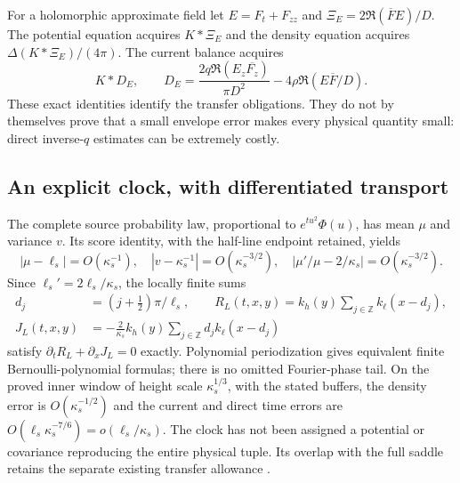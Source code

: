 For a holomorphic approximate field let $E=F_t+F_{zz}$ and
$\Xi_E=2\Re(\overline F E)/D$. The potential equation acquires
$K*\Xi_E$ and the density equation acquires
$\Delta(K*\Xi_E)/(4\pi)$. The current balance acquires
\begin{equation}
 K*D_E,\qquad
 D_E=\frac{2q\Re(E_z\overline{F_z})}{\pi D^2}
             -4\rho\Re(E\overline F/D).
 \label{eq:holomorphic-defect}
\end{equation}
These exact identities identify the transfer obligations. They do not
by themselves prove that a small envelope error makes every physical
quantity small: direct inverse-$q$ estimates can be extremely costly.

\subsection{An explicit clock, with differentiated transport}
The complete source probability law, proportional to $e^{tu^2}\Phi(u)$,
has mean $\mu$ and variance $v$. Its score identity, with the half-line
endpoint retained, yields
\begin{equation}
 |\mu-\ell_s|=O(\kappa_s^{-1}),\quad
 |v-\kappa_s^{-1}|=O(\kappa_s^{-3/2}),\quad
 |\mu'/\mu-2/\kappa_s|=O(\kappa_s^{-3/2}).
 \label{eq:score-refinement}
\end{equation}
Since $\ell_s'=2\ell_s/\kappa_s$, the locally finite sums
\begin{align}
 d_j&=(j+\tfrac12)\pi/\ell_s,\qquad
 R_L(t,x,y)=k_h(y)\sum_{j\in\mathbb Z}k_\ell(x-d_j),\\
 J_L(t,x,y)&=-\frac2{\kappa_s}k_h(y)
                       \sum_{j\in\mathbb Z}d_j k_\ell(x-d_j)
 \label{eq:clock}
\end{align}
satisfy $\partial_tR_L+\partial_xJ_L=0$ exactly. Polynomial
periodization gives equivalent finite Bernoulli-polynomial formulas;
there is no omitted Fourier-phase tail. On the proved inner window of
height scale $\kappa_s^{1/3}$, with the stated buffers, the density
error is $O(\kappa_s^{-1/2})$ and the current and direct time errors
are $O(\ell_s\kappa_s^{-7/6})=o(\ell_s/\kappa_s)$.
The clock has not been assigned a potential or covariance reproducing
the entire physical tuple. Its overlap with the full saddle retains
the separate existing transfer allowance \cite{parent}.


